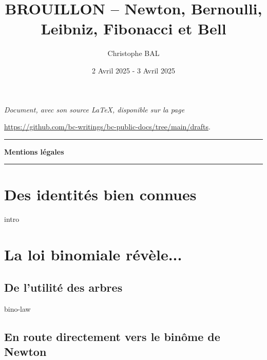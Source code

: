 \documentclass[12pt]{amsart}
\begin{document}
\title{BROUILLON -- Newton, Bernoulli, Leibniz, Fibonacci et Bell}
\author{Christophe BAL}
\date{2 Avril 2025 - 3 Avril 2025}

\maketitle

\begin{center}
	\itshape
	Document, avec son source \LaTeX, disponible sur la page

	\url{https://github.com/bc-writings/bc-public-docs/tree/main/drafts}.
\end{center}


\bigskip


\begin{center}
	\hrule\vspace{.3em}
	{
		\fontsize{1.35em}{1em}\selectfont
		\textbf{Mentions \og légales \fg}
	}

	\vspace{0.45em}
	\doclicenseThis
	\hrule
\end{center}


\bigskip


\setcounter{tocdepth}{2}
\tableofcontents




\newpage

\section{Des identités bien connues}

{intro}




\section{La loi binomiale révèle...}

\subsection{De l'utilité des arbres}

{bino-law}


\subsection{En route directement vers le binôme de Newton}
\end{document}
